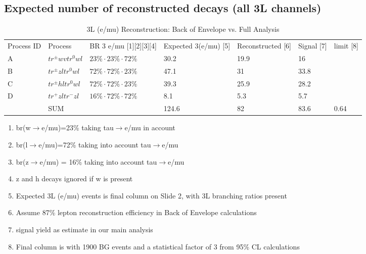\subsection*{Expected number of reconstructed decays (all 3L channels)}

\begin{table}[h!]
\footnotesize
\centering
\caption{3L (e/mu) Reconstruction: Back of Envelope vs. Full Analysis} %
\begin{tabular}{lllllll}
Process ID & Process       & BR 3 e/mu [1][2][3][4] & Expected 3(e/mu) [5] & Reconstructed [6] & Signal [7] & limit [8] \\
A          & $tr^\pm wvtr^0wl$ & $23\% \cdot 23\% \cdot 72\%$                         & 30.2                              & 19.9                                      & 16                                     &                                       \\
B          & $tr^\pm zltr^0wl$ & $72\% \cdot 72\% \cdot 23\%$                         & 47.1                              & 31                                        & 33.8                                   &                                       \\
C          & $tr^\pm hltr^0wl$ & $72\% \cdot 72\% \cdot 23\%$                         & 39.3                              & 25.9                                      & 28.2                                   &                                       \\
D          & $tr^+zltr^-zl$    & $16\% \cdot 72\% \cdot 72\%$                         & 8.1                               & 5.3                                       & 5.7                                    &                                       \\
           & SUM           &                                        & 124.6                             & 82                                        & 83.6                                   & 0.64                                 
\end{tabular}
\end{table}

\begin{enumerate}
	\item br(w$\to$e/mu)=23\% taking tau$\to$e/mu in account
	\item br(l$\to$e/mu)=72\% taking into account tau$\to$e/mu
	\item br(z$\to$e/mu) = 16\% taking into account tau$\to$e/mu
	\item z and h decays ignored if w is present
	\item Expected 3L (e/mu) events is final column on Slide 2, with 3L branching ratios present
	\item Assume 87\% lepton reconstruction efficiency in Back of Envelope calculations
	\item signal yield as estimate in our main analysis
	\item Final column is with 1900 BG events and a statistical factor of 3 from 95\% CL calculations
\end{enumerate}


